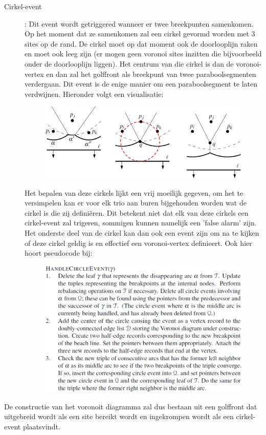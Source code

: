 \documentclass[12pt,a4paper]{article}
\begin{document}
\begin{description}
		\item[Cirkel-event]: Dit event wordt getriggered wanneer er twee breekpunten samenkomen. Op het moment dat ze samenkomen zal een cirkel gevormd worden met 3 sites op de rand. De cirkel moet op dat moment ook de doorlooplijn raken en moet ook leeg zijn (er mogen geen voronoi sites inzitten die bijvoorbeeld onder de doorlooplijn liggen). Het centrum van die cirkel is dan de voronoi-vertex en dan zal het golffront als breekpunt van twee paraboolsegmenten verdergaan. Dit event is de enige manier om een paraboolsegment te laten verdwijnen. Hieronder volgt een visualisatie: 
		\begin{figure}[H]
			\centering
			\includegraphics[width=0.7\linewidth]{afbeeldingen/voronoi/cirkel-event}
			\label{fig:cirkel-event}
		\end{figure}
		Het bepalen van deze cirkels lijkt een vrij moeilijk gegeven, om het te versimpelen kan er voor elk trio aan buren bijgehouden worden wat de cirkel is die zij definiëren. Dit betekent niet dat elk van deze cirkels een cirkel-event zal trigeren, sommigen kunnen namelijk een 'false alarm' zijn. Het onderste deel van de cirkel kan dan ook een event zijn om na te kijken of deze cirkel geldig is en effectief een voronoi-vertex definieert. Ook hier hoort pseudocode bij: 
		\begin{figure}[H]
			\centering
			\includegraphics[width=0.8\linewidth]{afbeeldingen/voronoi/handeCircleEvent}
			\label{fig:handecircleevent}
		\end{figure}
		
	\end{description}
	De constructie van het voronoit diagramma zal dus bestaan uit een golffront dat uitgebreid wordt als een site bereikt wordt en ingekrompen wordt als een cirkel-event plaatsvindt. 
	
\end{document}

